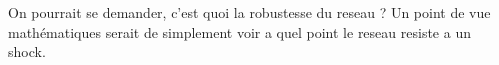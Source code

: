 On pourrait se demander, c'est quoi la robustesse du reseau ?
Un point de vue mathématiques serait de simplement voir a quel point le reseau resiste a un shock.